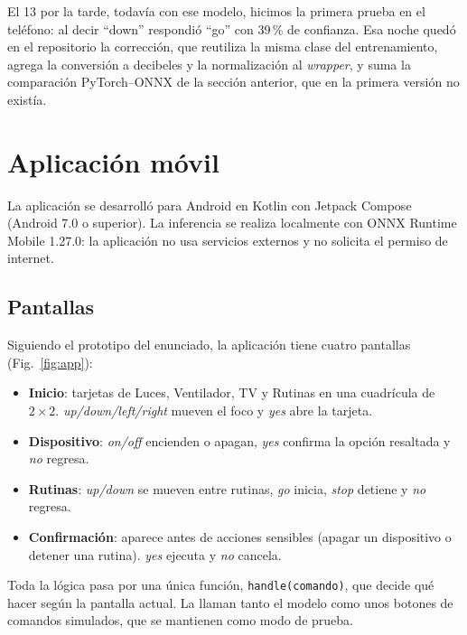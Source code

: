 \documentclass[conference]{IEEEtran}
\begin{document}
El 13 por la tarde, todavía con ese modelo, hicimos la primera prueba en el teléfono: al decir ``down'' respondió ``go'' con 39\,\% de confianza. Esa noche quedó en el repositorio la corrección, que reutiliza la misma clase del entrenamiento, agrega la conversión a decibeles y la normalización al \textit{wrapper}, y suma la comparación PyTorch--ONNX de la sección anterior, que en la primera versión no existía.

\section{Aplicación móvil}
La aplicación se desarrolló para Android en Kotlin con Jetpack Compose (Android 7.0 o superior). La inferencia se realiza localmente con ONNX Runtime Mobile 1.27.0: la aplicación no usa servicios externos y no solicita el permiso de internet.

\subsection{Pantallas}
Siguiendo el prototipo del enunciado, la aplicación tiene cuatro pantallas (Fig.~\ref{fig:app}):

\begin{itemize}
  \item \textbf{Inicio}: tarjetas de Luces, Ventilador, TV y Rutinas en una cuadrícula de $2\times2$. \textit{up/down/left/right} mueven el foco y \textit{yes} abre la tarjeta.
  \item \textbf{Dispositivo}: \textit{on/off} encienden o apagan, \textit{yes} confirma la opción resaltada y \textit{no} regresa.
  \item \textbf{Rutinas}: \textit{up/down} se mueven entre rutinas, \textit{go} inicia, \textit{stop} detiene y \textit{no} regresa.
  \item \textbf{Confirmación}: aparece antes de acciones sensibles (apagar un dispositivo o detener una rutina). \textit{yes} ejecuta y \textit{no} cancela.
\end{itemize}

Toda la lógica pasa por una única función, \texttt{handle(comando)}, que decide qué hacer según la pantalla actual. La llaman tanto el modelo como unos botones de comandos simulados, que se mantienen como modo de prueba.
\end{document}
